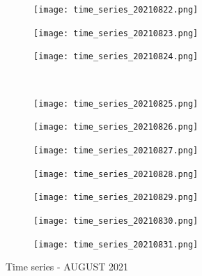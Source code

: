 \documentclass[10pt]{article}
\begin{document}
\begin{figure}[!h]
\begin{subfigure}[b]{0.166\linewidth}
        \centering
        \texttt{[image: time\_series\_20210822.png]}
    \end{subfigure}%
    \begin{subfigure}[b]{0.166\linewidth}
        \centering
        \texttt{[image: time\_series\_20210823.png]}
    \end{subfigure}%
    \begin{subfigure}[b]{0.166\linewidth}
        \centering
        \texttt{[image: time\_series\_20210824.png]}
    \end{subfigure}
    \\
    \begin{subfigure}[b]{0.166\linewidth}
        \centering
        \texttt{[image: time\_series\_20210825.png]}
    \end{subfigure}%
    \begin{subfigure}[b]{0.166\linewidth}
        \centering
        \texttt{[image: time\_series\_20210826.png]}
    \end{subfigure}%
        \begin{subfigure}[b]{0.166\linewidth}
        \centering
        \texttt{[image: time\_series\_20210827.png]}
    \end{subfigure}%
    \begin{subfigure}[b]{0.166\linewidth}
        \centering
        \texttt{[image: time\_series\_20210828.png]}
    \end{subfigure}%
    \begin{subfigure}[b]{0.166\linewidth}
        \centering
        \texttt{[image: time\_series\_20210829.png]}
    \end{subfigure}%
    \begin{subfigure}[b]{0.166\linewidth}
        \centering
        \texttt{[image: time\_series\_20210830.png]}
    \end{subfigure}%
    \begin{subfigure}[b]{0.166\linewidth}
        \centering
        \texttt{[image: time\_series\_20210831.png]}
    \end{subfigure}
     \caption{Time series - AUGUST 2021}
\label{fig:bands}
\end{figure}
\end{document}
